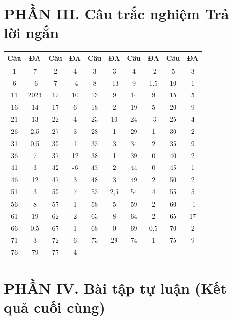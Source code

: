 \documentclass[12pt]{article}
\begin{document}
\section*{PHẦN III. Câu trắc nghiệm Trả lời ngắn}
\begin{center}
	\begin{tabular}{|c|c|c|c|c|c|c|c|c|c|}
		\hline
		\textbf{Câu} & \textbf{ĐA} & \textbf{Câu} & \textbf{ĐA} & \textbf{Câu} & \textbf{ĐA} & \textbf{Câu} & \textbf{ĐA} & \textbf{Câu} & \textbf{ĐA} \\
		\hline
		1 & 7 & 2 & 4 & 3 & 3 & 4 & -2 & 5 & 3 \\
		\hline
		6 & -6 & 7 & -4 & 8 & -13 & 9 & 1,5 & 10 & 1 \\
		\hline
		11 & 2026 & 12 & 10 & 13 & 9 & 14 & 9 & 15 & 5 \\
		\hline
		16 & 14 & 17 & 6 & 18 & 2 & 19 & 5 & 20 & 9 \\
		\hline
		21 & 13 & 22 & 4 & 23 & 10 & 24 & -3 & 25 & 4 \\
		\hline
		26 & 2,5 & 27 & 3 & 28 & 1 & 29 & 1 & 30 & 2 \\
		\hline
		31 & 0,5 & 32 & 1 & 33 & 3 & 34 & 2 & 35 & 9 \\
		\hline
		36 & 7 & 37 & 12 & 38 & 1 & 39 & 0 & 40 & 2 \\
		\hline
		41 & 3 & 42 & -6 & 43 & 2 & 44 & 0 & 45 & 1 \\
		\hline
		46 & 12 & 47 & 3 & 48 & 3 & 49 & 2 & 50 & 2 \\
		\hline
		51 & 3 & 52 & 7 & 53 & 2,5 & 54 & 4 & 55 & 5 \\
		\hline
		56 & 8 & 57 & 1 & 58 & 5 & 59 & 2 & 60 & -1 \\
		\hline
		61 & 19 & 62 & 2 & 63 & 8 & 64 & 2 & 65 & 17 \\
		\hline
		66 & 0,5 & 67 & 1 & 68 & 0 & 69 & 0,5 & 70 & 2 \\
		\hline
		71 & 3 & 72 & 6 & 73 & 29 & 74 & 1 & 75 & 9 \\
		\hline
		76 & 79 & 77 & 4 &  &  &  &  &  &  \\
		\hline
		\end{tabular}
\end{center}

\section*{PHẦN IV. Bài tập tự luận (Kết quả cuối cùng)}
\end{document}

